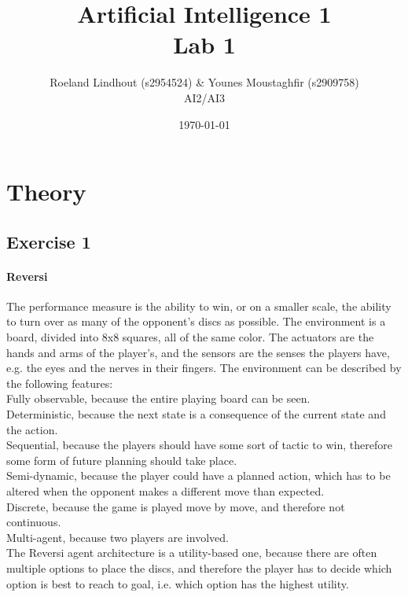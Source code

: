\documentclass{article}
\title{Artificial Intelligence 1 \\ Lab 1}%
\author{Roeland Lindhout (s2954524) \& Younes Moustaghfir (s2909758) \\ AI2/AI3} %
\date{\today}%
\begin{document}
	
	\maketitle
	
	\section*{Theory}
	\subsection*{Exercise 1}
	\paragraph{Reversi} The performance measure is the ability to win, or on a smaller scale, the ability to turn over as many of the opponent's discs as possible. The environment is a board, divided into 8x8 squares, all of the same color. The actuators are the hands and arms of the player's, and the sensors are the senses the players have, e.g. the eyes and the nerves in their fingers. The environment can be described by the following features: \\
	Fully observable, because the entire playing board can be seen. \\
	Deterministic, because the next state is a consequence of the current state and the action. \\
	Sequential, because the players should have some sort of tactic to win, therefore some form of future planning should take place. \\
	Semi-dynamic, because the player could have a planned action, which has to be altered when the opponent makes a different move than expected. \\
	Discrete, because the game is played move by move, and therefore not continuous. \\
	Multi-agent, because two players are involved. \\
	The Reversi agent architecture is a utility-based one, because there are often multiple options to place the discs, and therefore the player has to decide which option is best to reach to goal, i.e. which option has the highest utility.
	
\end{document}
